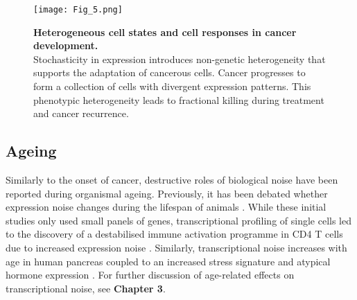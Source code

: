 \begin{figure}[!h]
\centering
\texttt{[image: Fig\_5.png]}
\caption[Heterogeneous cell states and cell responses in cancer development]{\textbf{Heterogeneous cell states and cell responses in cancer development.}\\
Stochasticity in expression introduces non-genetic heterogeneity that supports the adaptation of cancerous cells. Cancer progresses to form a collection of cells with divergent expression patterns. This phenotypic heterogeneity leads to fractional killing during treatment and cancer recurrence.}
\label{fig0:cancer}
\end{figure}

\newpage

\subsection{Ageing}

Similarly to the onset of cancer, destructive roles of biological noise have been reported during organismal ageing. Previously, it has been debated whether expression noise changes during the lifespan of animals \cite{Bahar2006, Warren2007}. While these initial studies only used small panels of genes, transcriptional profiling of single cells led to the discovery of a destabilised immune activation programme in CD4\plus{} T cells due to increased expression noise \cite{Martinez-jimenez2017}. Similarly, transcriptional noise increases with age in human pancreas coupled to an increased stress signature and atypical hormone expression \citep{Enge2017}. For further discussion of age-related effects on transcriptional noise, see \textbf{Chapter 3}. \\


